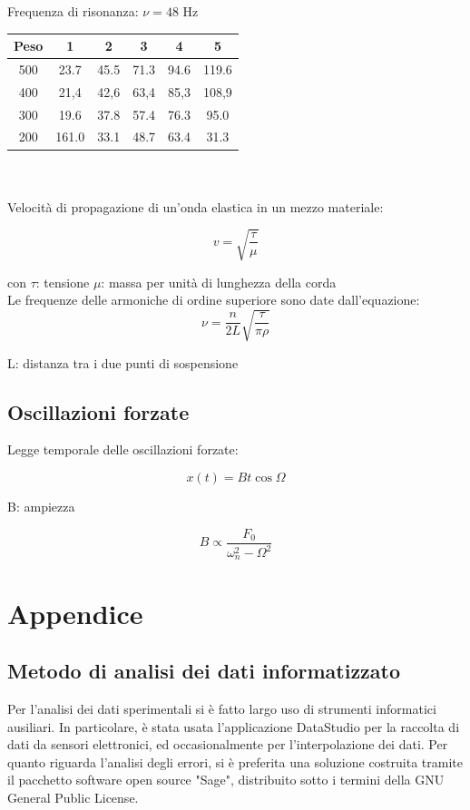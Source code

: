\documentclass[a4paper,10pt]{report}
\begin{document}
Frequenza di risonanza: $\nu= 48$ Hz\\

\begin{tabular}{ c | c | c | c | c | c }
Peso & 1 & 2 & 3 & 4 & 5\\
\midrule
500 & 23.7 & 45.5 & 71.3 & 94.6 & 119.6\\
400 & 21,4 & 42,6 & 63,4 & 85,3 & 108,9\\
300 & 19.6 & 37.8 & 57.4 & 76.3 & 95.0\\
200 & 161.0 & 33.1 & 48.7 & 63.4 & 31.3 \\
\end{tabular}\\
\\
Velocità di propagazione di un'onda elastica in un mezzo materiale:

\begin{equation}
v=\sqrt{\frac{\tau}{\mu}}
\end{equation}

con $\tau$: tensione 
$\mu$: massa per unità di lunghezza della corda\\

Le frequenze delle armoniche di ordine superiore sono date dall'equazione:
\begin{equation}
\nu=\frac{n}{2L}\sqrt{\frac{\tau}{\pi\rho}}
\end{equation}

L: distanza tra i due punti di sospensione

\section{Oscillazioni forzate}
Legge temporale delle oscillazioni forzate:

\begin{equation}
x(t)=Bt\cos\Omega
\end{equation}

B: ampiezza

\begin{equation}
B\propto\frac{F_0}{\omega_n^2-\Omega^2}
\end{equation}
\chapter*{Appendice}
\section*{Metodo di analisi dei dati informatizzato}
Per l'analisi dei dati sperimentali si è fatto largo uso di strumenti informatici ausiliari.
In particolare, è stata usata l'applicazione DataStudio per la raccolta di dati da sensori elettronici, ed occasionalmente per l'interpolazione dei dati.
Per quanto riguarda l'analisi degli errori, si è preferita una soluzione costruita tramite il pacchetto software open source "Sage", distribuito sotto i termini della GNU General Public License.
\end{document}
